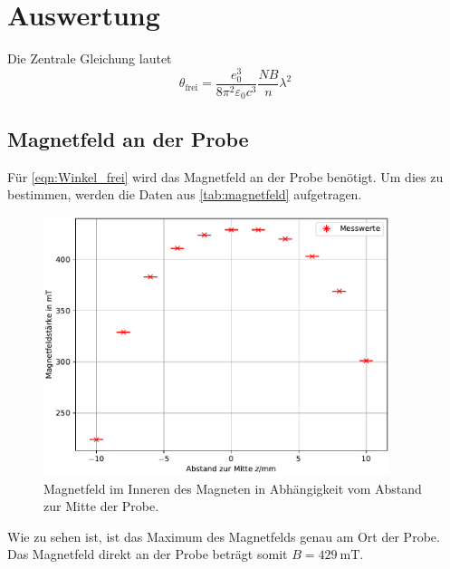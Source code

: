 


\section{Auswertung}
\label{sec:Auswertung}

%
%
%
Die Zentrale Gleichung lautet 
\begin{equation}
    \theta_\text{frei} = \frac{e_0^3}{8 \pi ^2 \varepsilon_0c^3} \frac{NB}{n} \lambda ^2
    \label{eqn:Winkel_frei}
\end{equation}
%
%
%
%

\subsection{Magnetfeld an der Probe}
\noindent Für \autoref{eqn:Winkel_frei} wird das Magnetfeld an der Probe benötigt. Um dies zu bestimmen, 
werden die Daten aus \autoref{tab:magnetfeld} aufgetragen.

\begin{figure}
    \centering
    \includegraphics[width = 0.9\textwidth]{../Magnetfeld.pdf}
    \caption{Magnetfeld im Inneren des Magneten in Abhängigkeit vom Abstand zur Mitte der Probe.}
    \label{fig:magnetfeld}
\end{figure}

\noindent Wie zu sehen ist, ist das Maximum des Magnetfelds genau am Ort der Probe. Das Magnetfeld 
direkt an der Probe beträgt somit 
%
%
$B=\qty{429}{\milli \tesla}$.
%
%
%
\subsection{}




